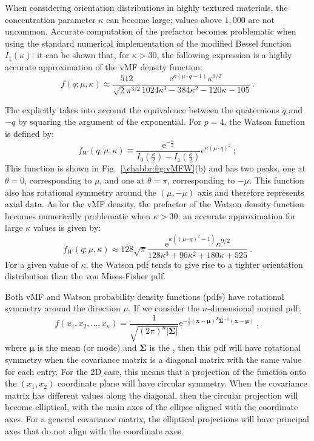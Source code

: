 When considering orientation distributions in highly textured materials, the concentration parameter $\kappa$ can become large; values above $1,000$ are not uncommon.
Accurate computation of the prefactor becomes problematic when using the standard numerical implementation of the modified Bessel function $I_1(\kappa)$; it can be shown that, for $\kappa>30$, the following expression is a highly accurate approximation of the vMF density function:
\begin{equation}
	f(q;\mu,\kappa) \approx \frac{512}{\sqrt{2}\pi^{3/2}}\frac{\mathrm{e}^{\kappa(\mu\cdot q-1)}\kappa^{9/2}}{1024\kappa^3-384\kappa^2-120\kappa-105}\ .	
\end{equation}

The  explicitly takes into account the equivalence between the quaternions $q$ and $-q$ by squaring the argument of the exponential. For $p=4$, the Watson function is defined by:
\begin{equation}
	f_W(q;\mu,\kappa) \equiv \frac{\mathrm{e}^{-\frac{\kappa}{2}}}{I_0(\frac{\kappa}{2})-I_1(\frac{\kappa}{2})}\mathrm{e}^{\kappa(\mu\cdot q)^2}\ ;\label{\chabbr:eq:Watsonpdf}
\end{equation}
This function is shown in Fig.~\ref{\chabbr:fig:vMFW}(b) and has two peaks, one at $\theta=0$, corresponding to $\mu$, and one at $\theta=\pi$, corresponding to $-\mu$. This function also has rotational symmetry around the $(\mu,-\mu)$ axis and therefore represents axial data. As for the vMF density, the prefactor of the Watson density function becomes numerically problematic when $\kappa>30$; an accurate approximation for large $\kappa$ values is given by:
\begin{equation}
	f_W(q;\mu,\kappa) \approx 128\sqrt{\pi}\frac{\mathrm{e}^{\kappa((\mu\cdot q)^2-1)}\kappa^{9/2}}{128\kappa^3+96\kappa^2+180\kappa+525}\ .	
\end{equation}
For a given value of $\kappa$, the Watson pdf tends to give rise to a tighter orientation distribution than the von Mises-Fisher pdf.

Both vMF and Watson probability density functions (pdfs) have rotational symmetry around the direction $\mu$. If we consider the $n$-dimensional normal pdf:
\begin{equation}
	f(x_1,x_2,\ldots,x_n)=\frac{1}{\sqrt{(2\pi)^n\vert\bm{\Sigma}\vert}}\mathrm{e}^{-\frac{1}{2}(\mathbf{x}-\bm{\mu})^T\bm{\Sigma}^{-1}(\mathbf{x}-\bm{\mu})}\ ,
\end{equation}
where $\bm{\mu}$ is the mean (or mode) and $\bm{\Sigma}$ is the , then this pdf will have rotational symmetry when the covariance matrix is a diagonal matrix with the same value for each entry. For the 2D case, this means that a projection of the function onto the $(x_1,x_2)$ coordinate plane will have circular symmetry. When the covariance matrix has different values along the diagonal, then the circular projection will become elliptical, with the main axes of the ellipse aligned with the coordinate axes. For a general covariance matrix, the elliptical projections will have principal axes that do not align with the coordinate axes.  

